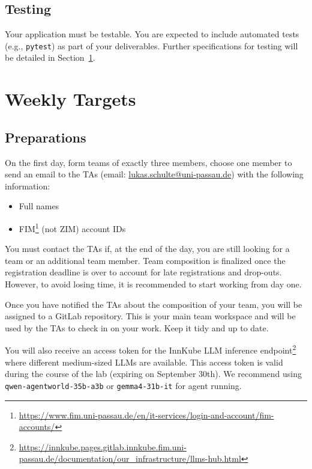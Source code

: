 \documentclass{article}
\begin{document}
\subsection{Testing}

Your application must be testable. You are expected to include automated tests (e.g., \texttt{pytest}) as part of your deliverables. Further specifications for testing will be detailed in Section~\ref{sec:weekly_targets}.

\section{Weekly Targets}
\label{sec:weekly_targets}

\subsection{Preparations}

On the first day, form teams of exactly three members, choose one member to send an email to the TAs (email: \url{lukas.schulte@uni-passau.de}) with the following information:

\begin{itemize}
    \item Full names
    \item FIM\footnote{\url{https://www.fim.uni-passau.de/en/it-services/login-and-account/fim-accounts/}} (not ZIM) account IDs
\end{itemize}

\noindent You must contact the TAs if, at the end of the day, you are still looking for a team or an additional team member. Team composition is finalized once the registration deadline is over to account for late registrations and drop-outs. However, to avoid losing time, it is recommended to start working from day one.

\vspace{5px}

\noindent Once you have notified the TAs about the composition of your team, you will be assigned to a GitLab repository. This is your main team workspace and will be used by the TAs to check in on your work. Keep it tidy and up to date.

\vspace{5px}

\noindent You will also receive an access token for the InnKube LLM inference endpoint\footnote{\url{https://innkube.pages.gitlab.innkube.fim.uni-passau.de/documentation/our_infrastructure/llms-hub.html}} where different medium-sized LLMs are available. This access token is valid during the course of the lab (expiring on September 30th). We recommend using \texttt{qwen-agentworld-35b-a3b} or \texttt{gemma4-31b-it} for agent running.
\end{document}
